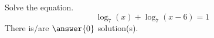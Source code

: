 \documentclass{ximera}
\author{Bobby Ramsey}
\begin{document}
\begin{exercise}
	Solve the equation.
	\[ \log_7(x) + \log_7(x-6) = 1 \]
	There is/are $\answer{0}$ solution(s).
\end{exercise}
\end{document}
